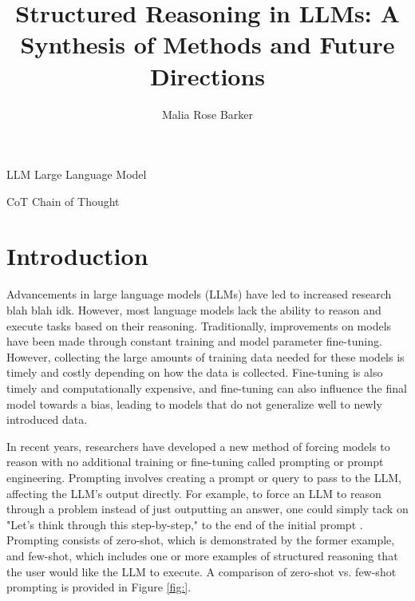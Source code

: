 \documentclass[project]{bsu-cs}  %
\title{Structured Reasoning in LLMs: A Synthesis of Methods and Future Directions}
\author{Malia Rose Barker}
\begin{document}
\frontmatter  %
% 
\buildFrontPages %
% 
\begin{listAbbreviations}
  \item[LLM] Large Language Model
  \item[CoT] Chain of Thought
\end{listAbbreviations}
% 
% 
\mainmatter
% 
%
%
% 
\chapter{Introduction} \label{ch:intro}
Advancements in large language models (LLMs) have led to increased research blah blah idk. However, most language models lack the ability to reason and execute tasks based on their reasoning. Traditionally, improvements on models have been made through constant training and model parameter fine-tuning. However, collecting the large amounts of training data needed for these models is timely and costly depending on how the data is collected. Fine-tuning is also timely and computationally expensive, and fine-tuning can also influence the final model towards a bias, leading to models that do not generalize well to newly introduced data. 

In recent years, researchers have developed a new method of forcing models to reason with no additional training or fine-tuning called prompting or prompt engineering. Prompting involves creating a prompt or query to pass to the LLM, affecting the LLM's output directly. For example, to force an LLM to reason through a problem instead of just outputting an answer, one could simply tack on "Let's think through this step-by-step," to the end of the initial prompt \citep{kojima2023largelanguagemodelszeroshot}. Prompting consists of zero-shot, which is demonstrated by the former example, and few-shot, which includes one or more examples of structured reasoning that the user would like the LLM to execute. A comparison of zero-shot vs. few-shot prompting is provided in Figure \ref{fig:}.
\end{document}
